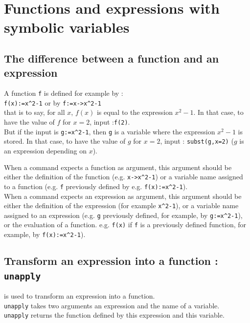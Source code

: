 \documentclass[a4paper,11pt]{book}
\begin{document}
\section{Functions and expressions with symbolic variables}
\subsection{The difference between a function and an expression}\index{->}\index{:=}
A function {\tt f} is defined for example by :\\
{\tt f(x):=x\verb|^|2-1} or by {\tt f:=x->x\verb|^|2-1} \\
that is to say, for all $x$, $f(x)$ is equal to the expression 
$x^2-1$. In that case, to have the value of $f$ for $x=2$, input :{\tt f(2)}.\\
But if the input is 
{\tt g:=x\verb|^|2-1}, then {\tt g} is a variable where the 
expression $x^2-1$ is stored. In that case, to have the value of $g$ for $x=2$,
input : {\tt subst(g,x=2)} ($g$ is an expression depending on $x$).

When a command expects a function as argument, this argument should
be either the definition of the function (e.g. {\tt x->x\verb|^|2-1})
or a variable name assigned to a function (e.g. {\tt f}
previously defined by e.g. {\tt f(x):=x\verb|^|2-1}).\\
When a command expects an expression as argument, this argument should
be either the definition of the expression (for example {\tt x\verb|^|2-1}), 
or a variable name assigned to an expression (e.g. 
{\tt g} previously defined, for example, by 
{\tt g:=x\verb|^|2-1}), or the evaluation of a function. e.g.
{\tt f(x)} if {\tt f} is a previously defined function,
for example, by {\tt f(x):=x\verb|^|2-1}).

\subsection{Transform an expression into a function : {\tt unapply}}
 is used to transform an expression into a function.\\
{\tt unapply} takes two arguments an expression and the name of a variable.\\
{\tt unapply} returns the function  defined by this expression and
this variable.
\end{document}
